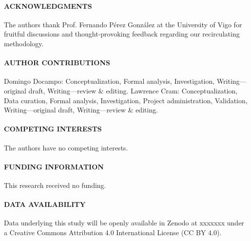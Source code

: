 \label{sec:addenda}
\paragraph{ACKNOWLEDGMENTS}


The authors thank Prof. Fernando Pérez González at the University of Vigo for fruitful discussions and thought-provoking feedback regarding our recirculating methodology.

\paragraph{AUTHOR CONTRIBUTIONS}


Domingo Docampo: Conceptualization, Formal analysis, Investigation,
Writing---original draft, Writing---review \& editing. Lawrence Cram:
Conceptualization, Data curation, Formal analysis, Investigation, Project administration, Validation, 
Writing---original draft, Writing---review \& editing.

\paragraph{COMPETING INTERESTS}


The authors have no competing interests.

\paragraph{FUNDING INFORMATION}

This research received no funding.

\paragraph{DATA AVAILABILITY}

Data underlying this study will be openly available in Zenodo at xxxxxxx
 under a Creative Commons Attribution 4.0 International License
(CC BY 4.0).